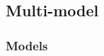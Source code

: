 %
%
%
%

\subsection{Multi-model}
\label{sec:fcu_into_mm}

\subsubsection{Models}
\label{sec:fcu_into_models}

%

